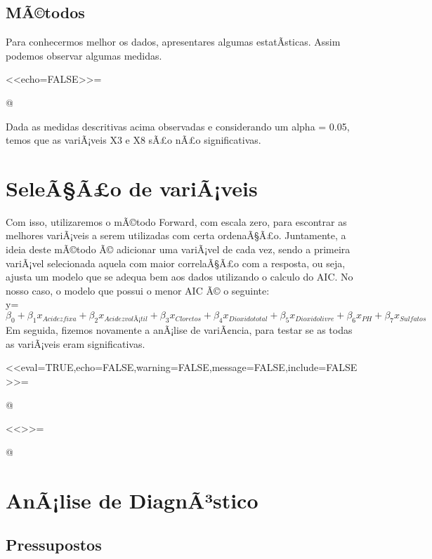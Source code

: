 \documentclass[a4paper]{article} %
\begin{document}
\pagebreak

\subsection{MÃ©todos}

Para conhecermos melhor os dados, apresentares algumas estatÃ­sticas. Assim podemos observar algumas medidas.

<<echo=FALSE>>=



@

\pagebreak

Dada as medidas descritivas acima observadas e considerando um alpha = 0.05, temos que as variÃ¡veis X3 e X8 sÃ£o nÃ£o significativas.

\section{SeleÃ§Ã£o de variÃ¡veis}

Com isso, utilizaremos o mÃ©todo Forward, com escala zero, para escontrar as melhores variÃ¡veis a serem utilizadas com certa ordenaÃ§Ã£o. Juntamente, a ideia deste mÃ©todo Ã© adicionar uma variÃ¡vel de cada vez, sendo a primeira variÃ¡vel selecionada aquela com maior correlaÃ§Ã£o com a resposta, ou seja, ajusta um modelo que se adequa bem aos dados utilizando o calculo do AIC. No nosso caso, o modelo que possui o menor AIC Ã© o seguinte:
\\

y= $ \beta_{0} + \beta_{1} x_{Acidezfixa} + \beta_{2} x_{AcidezvolÃ¡til} + \beta_{3} x_{Cloretos} + \beta_{4} x_{Dioxidototal} + \beta_{5} x_{Dioxidolivre} + \beta_{6} x_{PH} + \beta_{7} x_{Sulfatos} $
\\

Em seguida, fizemos novamente a anÃ¡lise de variÃ¢ncia, para testar se as todas as variÃ¡veis eram significativas.

<<eval=TRUE,echo=FALSE,warning=FALSE,message=FALSE,include=FALSE>>=



@

<<>>=

@

\pagebreak

\section{AnÃ¡lise de DiagnÃ³stico}

\subsection{Pressupostos}
\end{document}
